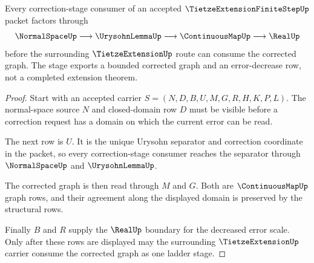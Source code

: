 \begin{theorem}
\label{thm:tietze-extension-finite-step-urysohn-stage}
Every correction-stage consumer of an accepted $\TietzeExtensionFiniteStepUp$ packet factors through
$$
\NormalSpaceUp \longrightarrow \UrysohnLemmaUp \longrightarrow \ContinuousMapUp \longrightarrow \RealUp
$$
before the surrounding $\TietzeExtensionUp$ route can consume the corrected graph. The stage exports a bounded corrected graph and an error-decrease row, not a completed extension theorem.
\end{theorem}
\begin{proof}
Start with an accepted carrier $S=(N,D,B,U,M,G,R,H,K,P,L)$. The normal-space source $N$ and closed-domain row $D$ must be visible before a correction request has a domain on which the current error can be read.

The next row is $U$. It is the unique Urysohn separator and correction coordinate in the packet, so every correction-stage consumer reaches the separator through $\NormalSpaceUp$ and $\UrysohnLemmaUp$.

The corrected graph is then read through $M$ and $G$. Both are $\ContinuousMapUp$ graph rows, and their agreement along the displayed domain is preserved by the structural rows.

Finally $B$ and $R$ supply the $\RealUp$ boundary for the decreased error scale. Only after these rows are displayed may the surrounding $\TietzeExtensionUp$ carrier consume the corrected graph as one ladder stage.
\end{proof}


\begin{closurestatus}{\TietzeExtensionFiniteStepUp}
  \theoryclosure{\seedClosure}
  \formalstatus{\unformalizedV}
\end{closurestatus}
